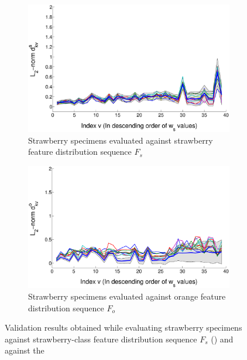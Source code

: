 \documentclass {udthesis}
\begin{document}
%
\begin{figure}
  \centering
  \begin{subfigure}[]{0.6\textwidth}
      \includegraphics[width=\textwidth]{validation_strawberry_testset_strawberry_learnset}
      \caption{Strawberry specimens evaluated against strawberry feature distribution sequence $F_s$}
      \label{fig:feat_results_strawberry_test_strawberry_learn}
  \end{subfigure}
  \begin{subfigure}[]{0.6\textwidth}
      \includegraphics[width=\textwidth]{validation_strawberry_testset_orange_learnset}
      \caption{Strawberry specimens evaluated against orange feature distribution sequence $F_o$}
      \label{fig:feat_results_strawberry_test_orange_learn}
  \end{subfigure}
\caption[Strawberry specimen validation results]{Validation results obtained 
while evaluating strawberry specimens against 
strawberry-class feature distribution sequence $F_s$ () and against the
}
\end{figure}
\end{document}
